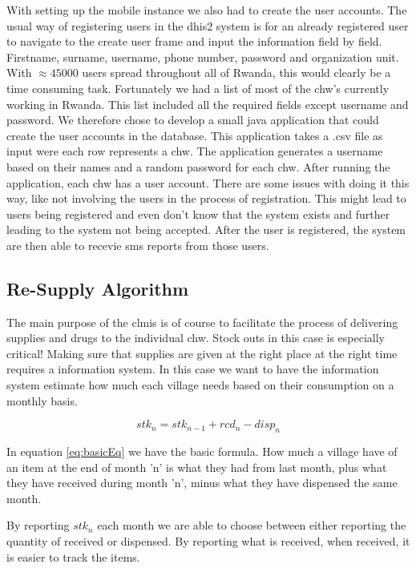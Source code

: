 With setting up the mobile instance we also had to create the user accounts. 
The usual way of registering users in the \gls{dhis2} system is for an already registered user to navigate to the create user frame and input the information field by field. Firstname, surname, username, phone number, password and organization unit. With $\approx 45000$ users spread throughout all of Rwanda, this would clearly be a time consuming task. Fortunately we had a list of most of the \gls{chw}'s currently working in Rwanda. This list included all the required fields except username and password. We therefore chose to develop a small java application that could create the user accounts in the database. This application takes a .csv file as input were each row represents a \gls{chw}. The application generates a username based on their names and a random password for each \gls{chw}. After running the application, each \gls{chw} has a user account. There are some issues with doing it this way, like not involving the users in the process of registration. This might lead to users being registered and even don't know that the system exists and further leading to the system not being accepted. After the user is registered, the system are then able to recevie \gls{sms} reports from those users. 

\subsection{Re-Supply Algorithm}
The main purpose of the \gls{clmis} is of course to facilitate the process of delivering supplies and drugs to the individual \gls{chw}. Stock outs in this case is especially critical! Making sure that supplies are given at the right place at the right time requires a information system. In this case we want to have the information system estimate how much each village needs based on their consumption on a monthly basis. 

\begin{equation}
stk_{n} = stk_{n-1} + rcd_{n} - disp_{n}
\label{eq:basicEq}
\end{equation}

In equation \ref{eq:basicEq} we have the basic formula. How much a village have of an item at the end of month 'n' is what they had from last month, plus what they have received during month 
'n', minus what they have dispensed the same month. 

By reporting $stk_{n}$ each month we are able to choose between either reporting the quantity of received or dispensed. By reporting what is received, when received, it is easier to track the items. 

